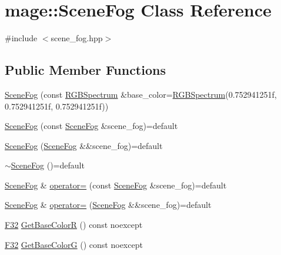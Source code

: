 \hypertarget{classmage_1_1_scene_fog}{}\section{mage\+:\+:Scene\+Fog Class Reference}
\label{classmage_1_1_scene_fog}


{\ttfamily \#include $<$scene\+\_\+fog.\+hpp$>$}

\subsection*{Public Member Functions}
\begin{DoxyCompactItemize}
\item 
\hyperlink{classmage_1_1_scene_fog_ab7504dee23779a9a6fd89cf446a5dc31}{Scene\+Fog} (const \hyperlink{structmage_1_1_r_g_b_spectrum}{R\+G\+B\+Spectrum} \&base\+\_\+color=\hyperlink{structmage_1_1_r_g_b_spectrum}{R\+G\+B\+Spectrum}(0.\+752941251f, 0.\+752941251f, 0.\+752941251f))
\item 
\hyperlink{classmage_1_1_scene_fog_a203934b340b718f9b6f136100df62268}{Scene\+Fog} (const \hyperlink{classmage_1_1_scene_fog}{Scene\+Fog} \&scene\+\_\+fog)=default
\item 
\hyperlink{classmage_1_1_scene_fog_a6080ed91eb76b5872646ca8d778a2856}{Scene\+Fog} (\hyperlink{classmage_1_1_scene_fog}{Scene\+Fog} \&\&scene\+\_\+fog)=default
\item 
\hyperlink{classmage_1_1_scene_fog_afb25181d31f74e4981c226019fee0669}{$\sim$\+Scene\+Fog} ()=default
\item 
\hyperlink{classmage_1_1_scene_fog}{Scene\+Fog} \& \hyperlink{classmage_1_1_scene_fog_a2312784458fe9d8e88dcfe5c444866a4}{operator=} (const \hyperlink{classmage_1_1_scene_fog}{Scene\+Fog} \&scene\+\_\+fog)=default
\item 
\hyperlink{classmage_1_1_scene_fog}{Scene\+Fog} \& \hyperlink{classmage_1_1_scene_fog_af019127d949d50173c9d4af51a8dcaef}{operator=} (\hyperlink{classmage_1_1_scene_fog}{Scene\+Fog} \&\&scene\+\_\+fog)=default
\item 
\hyperlink{namespacemage_aa97e833b45f06d60a0a9c4fc22ae02c0}{F32} \hyperlink{classmage_1_1_scene_fog_a5eb899a4a5f0dc60edc82c88dcd1ca5a}{Get\+Base\+ColorR} () const noexcept
\item 
\hyperlink{namespacemage_aa97e833b45f06d60a0a9c4fc22ae02c0}{F32} \hyperlink{classmage_1_1_scene_fog_a016dc4f134493d4af0420049c38e77ea}{Get\+Base\+ColorG} () const noexcept
\item 

\end{DoxyCompactItemize}

